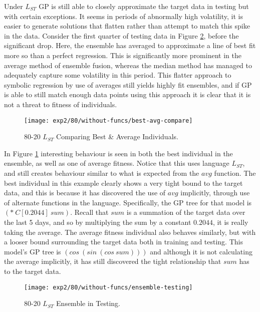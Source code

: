 \documentclass[12pt, letterpaper]{article}
\begin{document}
\textrm{ \indent Under $L_{ST}$ GP is still able to closely approximate the target data in testing but with certain exceptions. It seems in periods of abnormally high volatility, it is easier to generate solutions that flatten rather than attempt to match this spike in the data. Consider the first quarter of testing data in Figure \ref{80-ens-without}, before the significant drop. Here, the ensemble has averaged to approximate a line of best fit more so than a perfect regression. This is significantly more prominent in the average method of ensemble fusion, whereas the median method has managed to adequately capture some volatility in this period. This flatter approach to symbolic regression by use of averages still yields highly fit ensembles, and if GP is able to still match enough data points using this approach it is clear that it is not a threat to fitness of individuals. }

\begin{figure}[!htb]
\centering
\texttt{[image: exp2/80/without-funcs/best-avg-compare]}
\caption{ 80-20 $L_{ST}$ Comparing Best \& Average Individuals.}
\label{80-inds-without}
\end{figure}

\textrm{ \indent In Figure \ref{80-inds-without} interesting behaviour is seen in both the best individual in the ensemble, as well as one of average fitness. Notice that this uses language $L_{ST}$, and still creates behaviour similar to what is expected from the $avg$ function. The best individual in this example clearly shows a very tight bound to the target data, and this is because it has discovered the use of $avg$ implicitly, through use of alternate functions in the language. Specifically, the GP tree for that model is $(*\ C[0.2044]\ sum)$. Recall that $sum$ is a summation of the target data over the last 5 days, and so by multiplying the sum by a constant $0.2044$, it is really taking the average. The average fitness individual also behaves similarly, but with a looser bound surrounding the target data both in training and testing. This model's GP tree is $(cos\ (sin\ (cos\ sum)))$ and although it is not calculating the average implicitly, it has still discovered the tight relationship that $sum$ has to the target data. }

\begin{figure}[!htb]
\centering
\texttt{[image: exp2/80/without-funcs/ensemble-testing]}
\caption{ 80-20 $L_{ST}$ Ensemble in Testing.}
\label{80-ens-without}
\end{figure}
\end{document}
